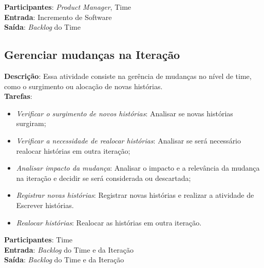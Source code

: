   \textbf{Participantes}: \textit{Product Manager}, Time\\

  \textbf{Entrada}: Incremento de Software \\

  \textbf{Saída}:   \textit{Backlog} do Time \\

\subsection{Gerenciar mudanças na Iteração}
  \textbf{Descrição}: Essa atividade consiste na gerência de mudanças no nível de time, como o surgimento ou alocação de novas histórias.\\

  \textbf{Tarefas}:
  \begin{itemize}
   \item \indent \textit{Verificar o surgimento de novos histórias}: Analisar se novas histórias surgiram;

   \item \indent \textit{Verificar a necessidade de realocar histórias}: Analisar se será necessário realocar histórias em outra iteração;
   
   \item \indent \textit{Analisar impacto da mudança}: Analisar o impacto e a relevância da mudança na iteração e decidir se será considerada
   ou descartada;

   \item \indent \textit{Registrar novas histórias}: Registrar novas histórias e realizar a atividade de Escrever histórias.

   \item \indent \textit{Realocar histórias}: Realocar as histórias em outra iteração.
  \end{itemize}

  \textbf{Participantes}: Time\\

  \textbf{Entrada}: \textit{Backlog} do Time e da Iteração\\

  \textbf{Saída}:  \textit{Backlog} do Time e da Iteração\\